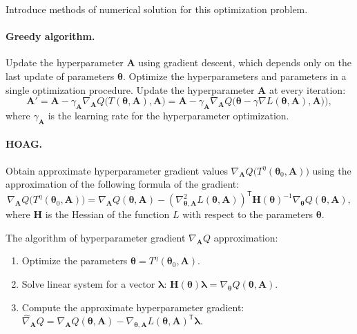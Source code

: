 \documentclass[12pt]{article}
\begin{document}
Introduce methods of numerical solution for this optimization problem.

\paragraph{Greedy algorithm.}
Update the hyperparameter $\mathbf{A}$ using gradient descent, which depends only on the last update of parameters $\boldsymbol{\theta}$. Optimize the hyperparameters and parameters in a single optimization procedure. Update the hyperparameter $\mathbf{A}$ at every iteration:
\[
	\mathbf{A}' = \mathbf{A} - \gamma_{\mathbf{A}} \nabla_{\mathbf{A}}  Q \bigl(T(\boldsymbol{\theta}, \mathbf{A}) , \mathbf{A}\bigr) = \mathbf{A} - \gamma_{\mathbf{A}} \nabla_{\mathbf{A}}  Q\bigl(\boldsymbol{\theta} - \gamma \nabla L(\boldsymbol{\theta}, \mathbf{A}), \mathbf{A})\bigr),
\]
where $\gamma_{\mathbf{A}}$ is the learning rate for the hyperparameter optimization.

\paragraph{HOAG.}
Obtain approximate hyperparameter gradient values  $\nabla_{\mathbf{A}} Q \bigl(T^\eta(\boldsymbol{\theta}_0, \mathbf{A})\bigr)$ using the approximation of the following  formula of the gradient:
\[
\nabla_{\mathbf{A}} Q \bigl(T^\eta(\boldsymbol{\theta}_0, \mathbf{A})\bigr) = \nabla_{\mathbf{A}} Q(\boldsymbol{\theta}, \mathbf{A}) - (\nabla^2_{\boldsymbol{\theta}, \mathbf{A}} L(\boldsymbol{\theta}, \mathbf{A}))^\mathsf{T}\mathbf{H}(\boldsymbol{\theta})^{-1}\nabla_{\boldsymbol{\theta}} Q(\boldsymbol{\theta}, \mathbf{A}),
\]
where $\mathbf{H}$ is the Hessian of the function $L$ with respect to the parameters $\boldsymbol{\theta}$.

The algorithm of hyperparameter gradient $\nabla_{\mathbf{A}} Q$  approximation:
\begin{enumerate}
\item Optimize the parameters $\boldsymbol{\theta} = T^\eta(\boldsymbol{\theta}_0, \mathbf{A})$.
\item Solve linear system for a vector $\boldsymbol{\lambda}$: $\mathbf{H}(\boldsymbol{\theta})\boldsymbol{\lambda} =  \nabla_{\boldsymbol{\theta}} Q(\boldsymbol{\theta}, \mathbf{A})$.
\item Compute the approximate hyperparameter gradient: $\hat{\nabla}_{\mathbf{A}}Q = \nabla_{\mathbf{A}}Q(\boldsymbol{\theta}, \mathbf{A}) -\nabla_{\boldsymbol{\theta}, \mathbf{A}} L(\boldsymbol{\theta}, \mathbf{A})^\mathsf{T}\boldsymbol{\lambda}$.
\end{enumerate}
\end{document}
